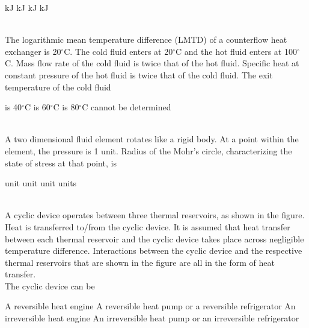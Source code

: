 \documentclass[addpoints,11pt]{exam}
\begin{document}
\begin{questions}
        \begin{oneparchoices}
             kJ
             kJ
             kJ
             kJ
        \end{oneparchoices}\\

        \question The logarithmic mean temperature difference (LMTD) of a counterflow heat exchanger is 20$^\circ$C. The cold fluid enters at 20$^\circ$C and the hot fluid enters at 100$^\circ$C. Mass flow rate of the cold fluid is twice that of the hot fluid. Specific heat at constant pressure of the hot fluid is twice that of the cold fluid. The exit temperature of the cold fluid\\

        \begin{oneparchoices}
            \choice is 40$^\circ$C
            \choice is 60$^\circ$C
            \choice is 80$^\circ$C
            \choice cannot be determined
        \end{oneparchoices}\\

        \question A two dimensional fluid element rotates like a rigid body. At a point within the element, the pressure is 1 unit. Radius of the Mohr's circle, characterizing the state of stress at that point, is\\

        \begin{oneparchoices}
             unit
             unit
             unit
             units
        \end{oneparchoices}\\

        \question A cyclic device operates between three thermal reservoirs, as shown in the figure. Heat is transferred to/from the cyclic device. It is assumed that heat transfer between each thermal reservoir and the cyclic device takes place across negligible temperature difference. Interactions between the cyclic device and the respective thermal reservoirs that are shown in the figure are all in the form of heat transfer.\\%
        The cyclic device can be

        \begin{choices}
            \choice A reversible heat engine
            \choice A reversible heat pump or a reversible refrigerator
            \choice An irreversible heat engine
            \choice An irreversible heat pump or an irreversible refrigerator
        \end{choices}


\end{questions}
\end{document}

